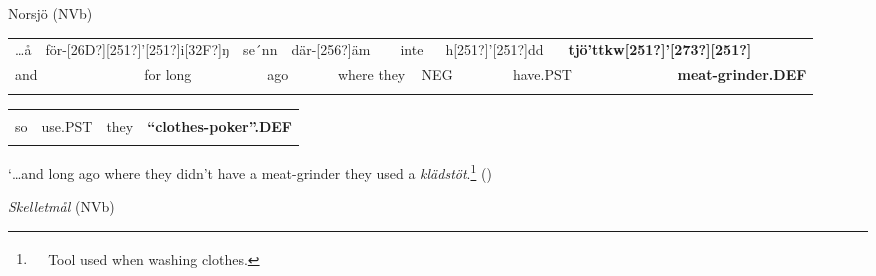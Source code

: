 \begin{listWWNumileveli}
\item 

\begin{styleExample}
Norsjö (NVb)

\end{styleExample}

\end{listWWNumileveli}

\begin{tabular}{llllllllllllll}
\lsptoprule
…å & \multicolumn{2}{l}{för-[26D?][251?]’[251?]i[32F?]ŋ

} & \multicolumn{2}{l}{se´nn

} & \multicolumn{2}{l}{där-[256?]äm

} & \multicolumn{2}{l}{inte

} & \multicolumn{2}{l}{h[251?]’[251?]dd

} & \multicolumn{2}{l}{{\bfseries tjö’ttkw[251?]’[273?][251?]}

} & \\
\multicolumn{2}{l}{and

} & \multicolumn{2}{l}{for long

} & \multicolumn{2}{l}{ago

} & \multicolumn{2}{l}{where they

} & \multicolumn{2}{l}{NEG

} & \multicolumn{2}{l}{have.PST

} & \multicolumn{2}{l}{{\bfseries meat-grinder.DEF}

}\\
\lspbottomrule
\end{tabular}

\begin{tabular}{llll}
\lsptoprule
\multicolumn{4}{l}{se

}\\
so & use.PST & they & {\bfseries “clothes-poker”.DEF}\\
\lspbottomrule
\end{tabular}

\begin{styleTranslation}
‘…and long ago where they didn’t have a meat-grinder they used a \textit{klädstöt}.\footnote{\textsuperscript{\ \ } Tool used when washing clothes.} (\citet[303]{Westerberg2004})

\end{styleTranslation}

\begin{listWWNumileveli}
\item 

\begin{styleExample}
\textit{Skelletmål} (NVb)

\end{styleExample}

\end{listWWNumileveli}

